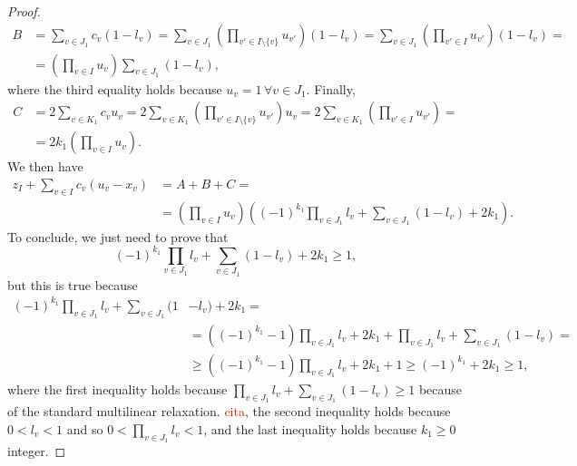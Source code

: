 \documentclass{article}
\begin{document}
\begin{proof}
\begin{align*}
			B & = \sum_{v \in J_1} c_v(1 - l_v) = \sum_{v \in J_1} (\prod_{v' \in I \setminus \{v\}}u_{v'})(1 - l_v) =
			\sum_{v \in J_1} (\prod_{v' \in I }u_{v'})(1 - l_v) = \\
			& =(\prod_{v \in I }u_v) \sum_{v \in J_1} (1 - l_v),
		\end{align*}
		where the third equality holds because \(u_v = 1 \, \forall v \in J_1\). Finally,
		\begin{align*}
			C & = 2\sum_{v \in K_1}c_v u_v  = 2 \sum_{v \in K_1} (\prod_{v' \in I \setminus \{v\}}u_{v'})u_v =
			2 \sum_{v \in K_1} (\prod_{v' \in I }u_{v'})  = \\ 
			& = 2k_1 (\prod_{v \in I }u_v).
		\end{align*}
		We then have 
		\begin{align*}
				z_I + \sum_{v \in I} c_v (u_v - x_v) &= A+B+C = \\
				& = (\prod_{v \in I }u_v) ((-1)^{k_1} \prod_{v \in J_1} l_v + \sum_{v \in J_1} (1 - l_v) +  2k_1).
		\end{align*}
		To conclude, we just need to prove that
		\begin{equation*}
			(-1)^{k_1} \prod_{v \in J_1} l_v + \sum_{v \in J_1} (1 - l_v) +  2k_1 \geq 1,
		\end{equation*} 
		but this is true because
		\begin{align*}
			(-1)^{k_1} \prod_{v \in J_1} l_v + \sum_{v \in J_1} (1 & - l_v)  +  2k_1 = \\
			& = ((-1)^{k_1}-1) \prod_{v \in J_1} l_v + 2k_1 + \prod_{v \in J_1} l_v + \sum_{v \in J_1} (1 - l_v) =  \\
			& \geq ((-1)^{k_1}-1) \prod_{v \in J_1} l_v + 2k_1 + 1 \geq (-1)^{k_1} + 2k_1 \geq 1,
		\end{align*}
		where the first inequality holds because \(\prod_{v \in J_1} l_v + \sum_{v \in J_1} (1 - l_v) \geq 1\) because of the standard multilinear relaxation. \textcolor{red}{cita}, the second inequality holds because \(0 < l_v < 1\) and so \(0 < \prod_{v \in J_1} l_v < 1\), and the last inequality holds because \(k_1 \geq 0\) integer.

\end{proof}
\end{document}
